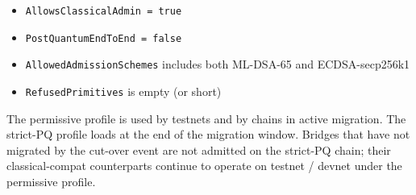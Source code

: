 \begin{itemize}[leftmargin=2em,nosep]
  \item \texttt{AllowsClassicalAdmin = true}
  \item \texttt{PostQuantumEndToEnd = false}
  \item \texttt{AllowedAdmissionSchemes} includes both ML-DSA-65 and
    ECDSA-secp256k1
  \item \texttt{RefusedPrimitives} is empty (or short)
\end{itemize}

The permissive profile is used by testnets and by chains in active
migration. The strict-PQ profile loads at the end of the migration window.
Bridges that have not migrated by the cut-over event are not admitted on
the strict-PQ chain; their classical-compat counterparts continue to
operate on testnet / devnet under the permissive profile.
